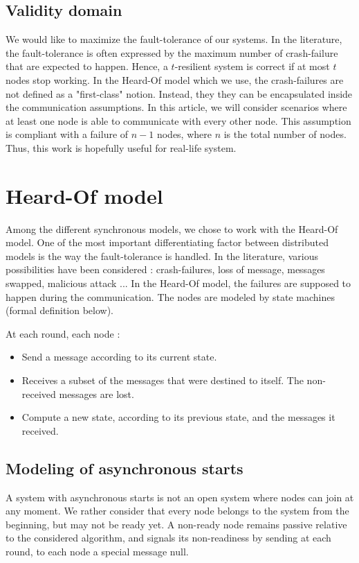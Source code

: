 \documentclass{article}
\begin{document}
\subsection{Validity domain}

We would like to maximize the fault-tolerance of our systems.
In the literature, the fault-tolerance is often expressed by the maximum number of crash-failure that are expected to happen.
Hence, a $t$-resilient system is correct if at most $t$ nodes stop working.
In the Heard-Of model \cite{model_ho} which we use, the crash-failures are not defined as a "first-class" notion.
Instead, they they can be encapsulated inside the communication assumptions.
In this article, we will consider scenarios where at least one node is able to communicate with every other node.
This assumption is compliant with a failure of $n-1$ nodes, where $n$ is the total number of nodes.
Thus, this work is hopefully useful for real-life system.

\section{Heard-Of model}

Among the different synchronous models, we chose to work with the Heard-Of model.
One of the most important differentiating factor between distributed models is the way the fault-tolerance is handled.
In the literature, various possibilities have been considered : crash-failures, loss of message, messages swapped, malicious attack ...
In the Heard-Of model, the failures are supposed to happen during the communication.
The nodes are modeled by state machines (formal definition below).

At each round, each node :
\begin{itemize}
	\item Send a message according to its current state.
	\item Receives a subset of the messages that were destined to itself. The non-received messages are lost.
	\item Compute a new state, according to its previous state, and the messages it received.
\end{itemize}

\subsection{Modeling of asynchronous starts}

A system with asynchronous starts is not an open system where nodes can join at any moment.
We rather consider that every node belongs to the system from the beginning, but may not be ready yet.
A non-ready node remains passive relative to the considered algorithm, and signals its non-readiness by sending at each round, to each node a special message null.
\end{document}
